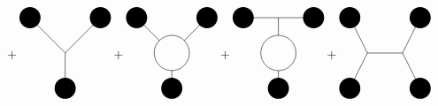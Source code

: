 \begin{equation}
\begin{aligned}
\begin{gathered}
\begin{tikzpicture}
            \end{tikzpicture}
       \end{gathered}\\
       &+
       \begin{gathered}
            \begin{tikzpicture}
                 \fill[black] (1,1) circle (0.3 cm);
                 \fill[black] (-1,1) circle (0.3 cm);
                 \fill[black] (0,-1) circle (0.3 cm);
                 \draw (0,0) -- (1,1);
                 \draw (0,0) -- (-1,1);
                 \draw (0,0) -- (0,-1);
            \end{tikzpicture}
       \end{gathered}+
       \begin{gathered}
            \begin{tikzpicture}
                 \fill[black] (1,1) circle (0.3 cm);
                 \fill[black] (-1,1) circle (0.3 cm);
                 \fill[black] (0,-1) circle (0.3 cm);
                 \draw (0.35,0.35) -- (1,1);
                 \draw (-0.35,0.35) -- (-1,1);
                 \draw (0,-0.5) -- (0,-1);
                 \draw (0,0) circle (0.5 cm);
            \end{tikzpicture}
       \end{gathered}+
       \begin{gathered}
            \begin{tikzpicture}
                \fill[black] (1,1) circle (0.3 cm);
                 \fill[black] (-1,1) circle (0.3 cm);
                 \fill[black] (0,-1) circle (0.3 cm);
                 \draw (-1,1) -- (1,1);
                 \draw (0,1) -- (0,0.5);
                 \draw (0,-0.5) -- (0,-1);
                 \draw (0,0) circle (0.5 cm);
            \end{tikzpicture}
       \end{gathered}+
       \begin{gathered}
            \begin{tikzpicture}
                \fill[black] (1,1) circle (0.3 cm);
                 \fill[black] (-1,1) circle (0.3 cm);
                 \fill[black] (-1,-1) circle (0.3cm);
                 \fill[black] (1,-1) circle (0.3 cm);
                 \draw (-0.5,0) -- (0.5,0);
                 \draw (-1,1) -- (-0.5,0);
                 \draw (1,1) -- (0.5,0);
                 \draw (-1,-1) -- (-0.5,0);
                 \draw (1,-1) -- (0.5,0);
            \end{tikzpicture}
       \end{gathered}\\

\end{aligned}
\end{equation}
